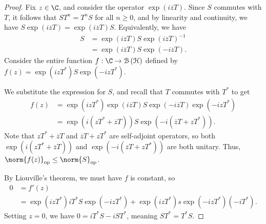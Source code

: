 \documentclass[10pt]{mypackage}
\begin{document}
\begin{proof}
  Fix $z\in \C$, and consider the operator $\exp\left(i\overline{z}T\right)$. Since $S$ commutes with $T$, it follows that $ST^{n} = T^{n}S$ for all $n\geq 0$, and by linearity and continuity, we have $S\exp\left(i\overline{z}T\right) = \exp\left(i\overline{z}T\right)S$. Equivalently, we have
  \begin{align*}
    S &= \exp\left(i\overline{z}T\right)S \exp\left(i\overline{z}T\right)^{-1}\\
      &= \exp\left(i\overline{z}T\right)S \exp\left(-i\overline{z}T\right).
  \end{align*}
  Consider the entire function $f: \C\rightarrow \mathcal{B}\left(\mathcal{H}\right)$ defined by $f\left(z\right) = \exp\left(izT^{\ast}\right)S\exp\left(-izT^{\ast}\right)$.\newline

  We substitute the expression for $S$, and recall that $T$ commutes with $T^{\ast}$ to get
  \begin{align*}
    f\left(z\right) &= \exp\left(izT^{\ast}\right)\exp\left(i\overline{z}T\right)S\exp\left(-i\overline{z}T\right)\exp\left(-izT^{\ast}\right)\\
                    &= \exp\left(i\left(zT^{\ast} + \overline{z}T\right)\right)S\exp\left(-i\left(\overline{z}T + zT^{\ast}\right)\right).
  \end{align*}
  Note that $zT^{\ast} + \overline{z}T$ and $\overline{z}T + zT^{\ast}$ are self-adjoint operators, so both $\exp\left(i\left(zT^{\ast} + \overline{z}T\right)\right)$ and $\exp\left(-i\left(\overline{z}T + zT^{\ast}\right)\right)$ are both unitary. Thus, $\norm{f(z)}_{\text{op}}\leq \norm{S}_{\text{op}}$.\newline

  By Liouville's theorem, we must have $f$ is constant, so
  \begin{align*}
    0 &= f'(z)\\
      &= \exp\left(izT^{\ast}\right)iT^{\ast}S\exp\left(-izT^{\ast}\right) + \exp\left(izT^{\ast}\right)s\exp\left(-izT^{\ast}\right)\left(-iT^{\ast}\right).
  \end{align*}
  Setting $z = 0$, we have $0 = iT^{\ast}S - iST^{\ast}$, meaning $ST^{\ast} = T^{\ast}S$.
\end{proof}
\end{document}
